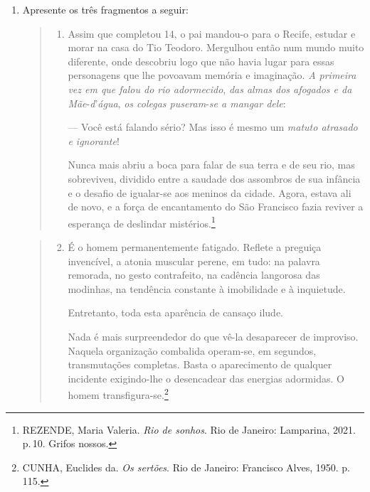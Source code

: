 \documentclass{extrarticle}
\begin{document}
\begin{enumerate}
\item Apresente os três fragmentos a seguir:

\begin{quote}
\begin{enumerate}
\item Assim que completou 14, o pai mandou-o para o Recife, estudar e
morar na casa do Tio Teodoro. Mergulhou então num mundo muito
diferente, onde descobriu logo que não havia lugar para essas
personagens que lhe povoavam memória e imaginação. \emph{A primeira
vez em que falou do rio adormecido}, \emph{das almas dos afogados e
da Mãe}-\emph{d}'\emph{água}, \emph{os colegas puseram}-\emph{se a
mangar dele}:

--- Você está falando sério? Mas isso é mesmo um \emph{matuto atrasado
e ignorante}!

Nunca mais abriu a boca para falar de sua terra e de seu rio, mas
sobreviveu, dividido entre a saudade dos assombros de sua infância e
o desafio de igualar-se aos meninos da cidade. Agora, estava ali de
novo, e a força de encantamento do São Francisco fazia reviver a
esperança de deslindar mistérios.\footnote{REZENDE, Maria Valeria. \emph{Rio de sonhos}. Rio de Janeiro: Lamparina, 2021. p.\,10. Grifos nossos.}
\end{enumerate}
\end{quote}

\begin{quote}
\begin{enumerate}
\setcounter{enumii}{1}
\item É o homem permanentemente fatigado. Reflete a preguiça invencível, a
atonia muscular perene, em tudo: na palavra remorada, no gesto
contrafeito, na cadência langorosa das modinhas, na tendência
constante à imobilidade e à inquietude.

Entretanto, toda esta aparência de cansaço ilude.

Nada é mais surpreendedor do que vê-la desaparecer de improviso.
Naquela organização combalida operam-se, em segundos, transmutações
completas. Basta o aparecimento de qualquer incidente exigindo-lhe o
desencadear das energias adormidas. O homem transfigura-se.\footnote{CUNHA, Euclides da. \emph{Os sertões}. Rio de Janeiro: Francisco Alves, 1950. p.\,115.}
\end{enumerate}
\end{quote}


\end{enumerate}
\end{document}
